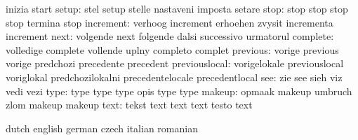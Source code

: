                            inizia                    start
                    setup: stel                      setup
                           stelle                    nastaveni
                           imposta                   setare
                     stop: stop                      stop
                           stop                      stop
                           termina                   stop
                increment: verhoog                   increment
                           erhoehen                  zvysit
                           incrementa                increment
                     next: volgende                  next
                           folgende                  dalsi
                           successivo                urmatorul
                 complete: volledige                 complete
                           vollende                  uplny
                           completo                  complet
                 previous: vorige                    previous
                           vorige                    predchozi
                           precedente                precedent
            previouslocal: vorigelokale              previouslocal
                           voriglokal                predchozilokalni
                           precedentelocale          precedentlocal
                      see: zie                       see
                           sieh                      viz
                           vedi                      vezi
                     type: type                      type
                           type                      opis
                           type                      type %
                   makeup: opmaak                    makeup
                           umbruch                   zlom
                           makeup                    makeup %
                     text: tekst                     text
                           text                      text
                           testo                     text

\stopelements


\startvariables            dutch                     english
                           german                    czech
                           italian                   romanian

